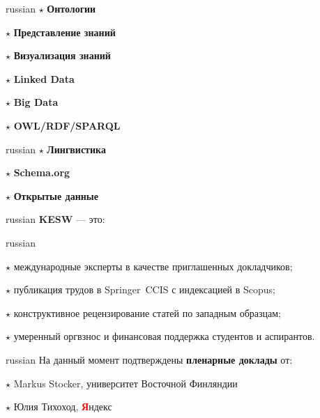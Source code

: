 \documentclass[a4paper, 10pt]{article}
\renewcommand{\skip}{\vspace{1ex}}
\renewcommand{\bullet}{\ensuremath{\star} }
\begin{document}
\begin{minipage}[t]{.35\textwidth}
\begin{otherlanguage*}{russian}
\noindent
\bullet \textbf{Онтологии}

\bullet \textbf{Представление знаний}

\bullet \textbf{Визуализация знаний}

\end{otherlanguage*}
\end{minipage}
\hfill
\begin{minipage}[t]{.30\textwidth}

\bullet \textbf{Linked Data}

\bullet \textbf{Big Data}

\bullet\textbf{OWL/RDF/SPARQL}

\end{minipage}
\hfill
\begin{minipage}[t]{.28\textwidth}

\begin{otherlanguage*}{russian}
\bullet \textbf{Лингвистика}

\bullet \textbf{Schema.org}

\bullet \textbf{Открытые данные}

\end{otherlanguage*}

\end{minipage}

\skip
\skip

\begin{otherlanguage*}{russian}
\noindent \textbf{KESW} --- это:
\end{otherlanguage*}

\skip\skip

\begin{otherlanguage*}{russian}

\noindent\bullet международные эксперты в качестве приглашенных докладчиков;

\noindent\bullet публикация трудов в Springer~CCIS с индексацией в Scopus;

\noindent\bullet конструктивное рецензирование статей по западным образцам;

\noindent\bullet умеренный оргвзнос и финансовая поддержка студентов и аспирантов.

\end{otherlanguage*}

\skip\skip


\begin{otherlanguage*}{russian}
\noindent На данный момент подтверждены \textbf{пленарные доклады} от:

\noindent\bullet Markus Stocker, университет Восточной Финляндии

\noindent\bullet Юлия Тихоход, \textcolor{red}{\textbf{Я}}ндекс
\end{otherlanguage*}
\end{document}
